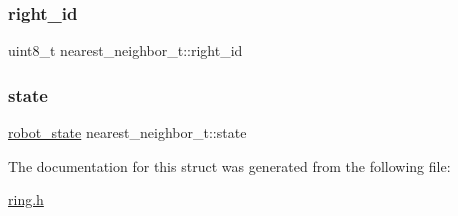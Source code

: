 \mbox{\label{structnearest__neighbor__t_af02c019de642bf55bdf9a4126fbcf834}} 
\subsubsection{\texorpdfstring{right\+\_\+id}{right\_id}}
{\footnotesize\ttfamily uint8\+\_\+t nearest\+\_\+neighbor\+\_\+t\+::right\+\_\+id}

\mbox{\label{structnearest__neighbor__t_a6888323805aed698b5485548a6b17390}} 
\subsubsection{\texorpdfstring{state}{state}}
{\footnotesize\ttfamily \hyperlink{ring_8h_a69b20b1a04c8e4cf3b72851b966259ec}{robot\+\_\+state} nearest\+\_\+neighbor\+\_\+t\+::state}



The documentation for this struct was generated from the following file\+:\begin{DoxyCompactItemize}
\item 
\hyperlink{ring_8h}{ring.\+h}\end{DoxyCompactItemize}
